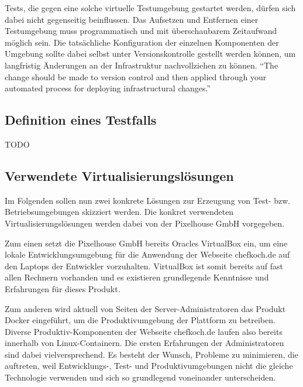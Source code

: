 Tests, die gegen eine solche virtuelle Testumgebung gestartet werden, dürfen sich dabei nicht gegenseitig beinflussen. Das Aufsetzen und Entfernen einer Testumgebung muss programmatisch und mit überschaubarem Zeitaufwand möglich sein. Die tatsächliche Konfiguration der einzelnen Komponenten der Umgebung sollte dabei selbst unter Versionskontrolle gestellt werden können, um langfristig Änderungen an der Infrastruktur nachvollziehen zu können. "`The change should be made to version control and then applied through your automated process for deploying infrastructural changes."' \citep[S.][S. 287]{HumFar10}

\subsection{Definition eines Testfalls}

TODO

\subsection{Verwendete Virtualisierungslösungen}

Im Folgenden sollen nun zwei konkrete Lösungen zur Erzeugung von Test- bzw. Betriebsumgebungen skizziert werden. Die konkret verwendeten Virtualisierungslösungen werden dabei von der Pixelhouse GmbH vorgegeben.

Zum einen setzt die Pixelhouse GmbH bereits Oracles VirtualBox ein, um eine lokale Entwicklungsumgebung für die Anwendung der Webseite chefkoch.de auf den Laptops der Entwickler vorzuhalten. VirtualBox ist somit bereits auf fast allen Rechnern vorhanden und es existieren grundlegende Kenntnisse und Erfahrungen für dieses Produkt.

Zum anderen wird aktuell von Seiten der Server-Administratoren das Produkt Docker eingeführt, um die Produktivumgebung der Plattform zu betreiben. Diverse Produktiv-Komponenten der Webseite chefkoch.de laufen also bereits innerhalb von Linux-Containern. Die ersten Erfahrungen der Administratoren sind dabei vielversprechend. Es besteht der Wunsch, Probleme zu minimieren, die auftreten, weil Entwicklungs-, Test- und Produktivumgebungen nicht die gleiche Technologie verwenden und sich so grundlegend voneinander unterscheiden.
